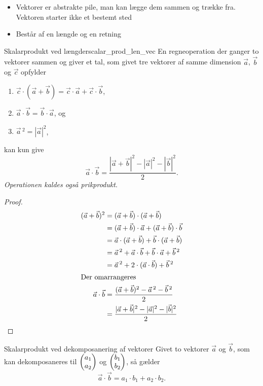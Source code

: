 \documentclass{article}
\begin{document}
\begin{itemize}
    \item Vektorer er abstrakte pile, man kan lægge dem sammen og trække fra.
        Vektoren starter ikke et bestemt sted
    \item Består af en længde og en retning
\end{itemize}
\begin{theorem}{Skalarprodukt ved længder}{scalar_prod_len_vec}
    En regneoperation der ganger to vektorer sammen og giver et tal, som givet
    tre vektorer af samme dimension $\vec{a}$, $\vec{b}$ og $\vec{c}$ opfylder
    \begin{enumerate}
        \item $\vec{c} \cdot (\vec{a} + \vec{b}) = \vec{c} \cdot \vec{a} + \vec{c} \cdot \vec{b}$,
        \item $\vec{a} \cdot \vec{b} = \vec{b} \cdot \vec{a}$, og
        \item $\vec{a}\,^2 = |\vec{a}|^2$,
    \end{enumerate}
    kan kun give
    \[
        \vec{a} \cdot \vec{b} = \frac{|\vec{a} + \vec{b}|^2 - |\vec{a}|^2 - |\vec{b}|^2}{2}.
    \] 
    \textit{Operationen kaldes også prikprodukt}.
\end{theorem}
\begin{proof}
\begin{align*}
    (\vec{a} + \vec{b})^2 &= (\vec{a} + \vec{b}) \cdot (\vec{a} + \vec{b})\\
                          &= (\vec{a} + \vec{b}) \cdot \vec{a} + (\vec{a} + \vec{b}) \cdot \vec{b}\\
                          &= \vec{a} \cdot (\vec{a} + \vec{b}) + \vec{b} \cdot (\vec{a} + \vec{b})\\
                          &= \vec{a}\,^2 + \vec{a} \cdot \vec{b} + \vec{b} \cdot \vec{a} + \vec{b}\,^2\\
                          &= \vec{a}\,^2 + 2 \cdot (\vec{a} \cdot \vec{b}) + \vec{b}\,^2\\
                          \intertext{Der omarrangeres}
    \vec{a} \cdot \vec{b} &= \frac{(\vec{a} + \vec{b})^2 - \vec{a}\,^2 - \vec{b}\,^2}{2}\\
                          &= \frac{|\vec{a} + \vec{b}|^2 - |\vec{a}|^2 - |\vec{b}|^2}{2}\qedhere
\end{align*}
\end{proof}

\begin{theorem}{Skalarprodukt ved dekomposanering af vektorer}{}
    Givet to vektorer $\vec{a}$ og $\vec{b}$, som kan dekomposaneres til $ \begin{pmatrix} a_1\\ a_2 \end{pmatrix} $ og $ \begin{pmatrix} b_1\\ b_2 \end{pmatrix} $, så gælder
    \[
        \vec{a} \cdot \vec{b} = a_1 \cdot b_1 + a_2 \cdot b_2.
    \] 
\end{theorem}
\end{document}
